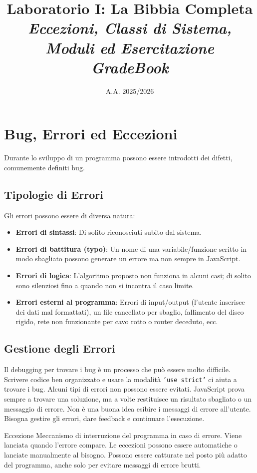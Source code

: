 \documentclass[12pt,a4paper]{article}
\title{\textcolor{paletteRegalia}{\Huge \textbf{Laboratorio I: La Bibbia Completa}} \\ 
\large \textit{Eccezioni, Classi di Sistema, Moduli ed Esercitazione GradeBook}}
\author{A.A. 2025/2026}
\date{}
\begin{document}
\maketitle
\tableofcontents
\newpage

\section{Bug, Errori ed Eccezioni}

Durante lo sviluppo di un programma possono essere introdotti dei difetti, comunemente definiti bug. 

\subsection{Tipologie di Errori}
Gli errori possono essere di diversa natura:
\begin{itemize}
    \item \textbf{Errori di sintassi}: Di solito riconosciuti subito dal sistema.
    \item \textbf{Errori di battitura (typo)}: Un nome di una variabile/funzione scritto in modo sbagliato possono generare un errore ma non sempre in JavaScript.
    \item \textbf{Errori di logica}: L'algoritmo proposto non funziona in alcuni casi; di solito sono silenziosi fino a quando non si incontra il caso limite.
    \item \textbf{Errori esterni al programma}: Errori di input/output (l'utente inserisce dei dati mal formattati), un file cancellato per sbaglio, fallimento del disco rigido, rete non funzionante per cavo rotto o router deceduto, ecc.
\end{itemize}

\subsection{Gestione degli Errori}
Il debugging per trovare i bug è un processo che può essere molto difficile. Scrivere codice ben organizzato e usare la modalità \texttt{'use strict'} ci aiuta a trovare i bug.
Alcuni tipi di errori non possono essere evitati. JavaScript prova sempre a trovare una soluzione, ma a volte restituisce un risultato sbagliato o un messaggio di errore. Non è una buona idea esibire i messaggi di errore all'utente. Bisogna gestire gli errori, dare feedback e continuare l'esecuzione.

\begin{definition}{Eccezione}
Meccanismo di interruzione del programma in caso di errore. Viene lanciata quando l'errore compare. Le eccezioni possono essere automatiche o lanciate manualmente al bisogno. Possono essere catturate nel posto più adatto del programma, anche solo per evitare messaggi di errore brutti.
\end{definition}
\end{document}
